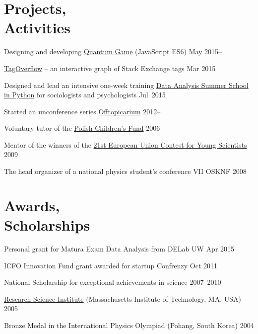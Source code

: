 \documentclass[margin,line]{resume}
\begin{document}
\begin{resume}

    \section{\mysidestyle Projects,\\Activities}

    \begin{list2}
        \item Designing and developing \href{http://quantumgame.io/}{Quantum Game} (JavaScript ES6) \hfill {May 2015--}
        \item \href{http://p.migdal.pl/tagoverflow}{TagOverflow} -- an interactive graph of Stack Exchange tags \hfill {Mar 2015}
        \item Designed and lead an intensive one-week training \href{http://www.delab.uw.edu.pl/szkola-letnia-dane-2015/}{Data Analysis Summer School in Python} for sociologists and psychologists \hfill { Jul~2015}
        \item Started an unconference series \href{http://offtopicarium.wikidot.com/}{Offtopicarium} \hfill { 2012--}
        \item Voluntary tutor of the \href{http://crastina.se/gifted-children-in-poland-by-piotr-migdal/}{Polish Children's Fund} \hfill { 2006--}
        \item Mentor of the winners of the \href{http://www.eucys09.fr/}{21st European Union Contest for Young Scientists}\hfill { 2009}
        \item The head organizer of a national physics student's conference VII OSKNF \hfill { 2008}
    \end{list2}


    \section{\mysidestyle Awards,\\Scholarships}
    \begin{list2}
        \item Personal grant for Matura Exam Data Analysis from DELab UW \hfill {Apr 2015}
    	\item ICFO Innovation Fund grant awarded for startup Confrenzy \hfill { Oct 2011}
        \item National Scholarship for exceptional achievements in science \hfill { 2007--2010}
        \item \href{http://www.cee.org/research-science-institute}{Research Science Institute} (Massachusetts Institute of Technology, MA, USA) \hfill { 2005}
        \item Bronze Medal in the International Physics Olympiad (Pohang, South Korea) \hfill { 2004}
    \end{list2}


\end{resume}
\end{document}
